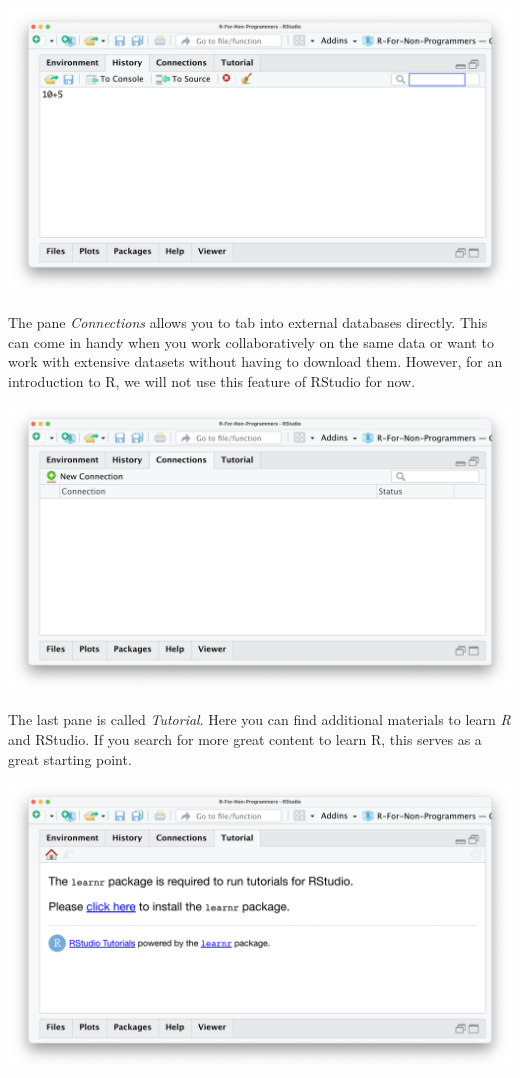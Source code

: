 \documentclass[
]{book}
\begin{document}
\includegraphics{images/chapter_04_img/04_environment_history_etc/02_rstudio_history.png}

The pane \emph{Connections} allows you to tab into external databases directly. This can come in handy when you work collaboratively on the same data or want to work with extensive datasets without having to download them. However, for an introduction to R, we will not use this feature of RStudio for now.

\includegraphics{images/chapter_04_img/04_environment_history_etc/03_rstudio_connections.png}

The last pane is called \emph{Tutorial}. Here you can find additional materials to learn \emph{R} and RStudio. If you search for more great content to learn R, this serves as a great starting point.

\includegraphics{images/chapter_04_img/04_environment_history_etc/04_rstudio_tutorial.png}
\end{document}
